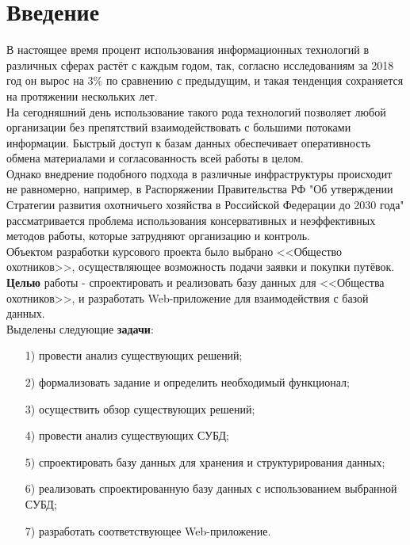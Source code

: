 \section*{Введение}
	
	В настоящее время процент использования информационных технологий в различных сферах растёт с каждым годом, так, согласно исследованиям \cite{Russia-in-numbers} за 2018 год он вырос на $3\%$ по сравнению с предыдущим, и такая тенденция сохраняется на протяжении нескольких лет.\\

	На сегодняшний день использование такого рода технологий позволяет любой организации без препятствий взаимодействовать с большими потоками информации. Быстрый доступ к базам данных обеспечивает оперативность обмена материалами и согласованность всей работы в целом. \\
	
	Однако внедрение подобного подхода в различные инфраструктуры происходит не равномерно, например, в Распоряжении Правительства РФ "Об утверждении Стратегии развития охотничьего хозяйства в Российской Федерации до 2030 года" \cite{doc_problems} рассматривается проблема использования консервативных и неэффективных методов работы, которые затрудняют организацию и контроль. \\
	
	Объектом разработки курсового проекта было выбрано <<Общество охотников>>, осуществляющее возможность подачи заявки и покупки путёвок. \\
	
	\textbf{Целью} работы - спроектировать и реализовать базу данных для <<Общества охотников>>, и разработать Web-приложение для взаимодействия с базой данных.\\
	Выделены следующие \textbf{задачи}:
	\begin{enumerate}
		\item[1)] провести анализ существующих решений;
		\item[2)] формализовать задание и определить необходимый функционал;
		\item[3)] осуществить обзор существующих решений;
		\item[4)] провести анализ существующих СУБД;
		\item[5)] спроектировать базу данных для хранения и структурирования данных;
		\item[6)] реализовать спроектированную базу данных с использованием выбранной СУБД;
		\item[7)] разработать соответствующее Web-приложение.
	\end{enumerate}
	  